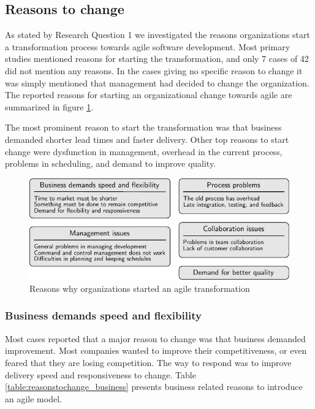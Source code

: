 \documentclass[preprint,authoryear,12pt]{elsarticle}
\begin{document}
\clearpage

\subsection{Reasons to change}

As stated by Research Question 1 we investigated the reasons organizations start
a transformation process towards agile software development. Most primary
studies mentioned reasons for starting the transformation, and only 7 cases of
42 did not mention any reasons. In the cases giving no specific reason to change
it was simply mentioned that management had decided to change the organization.
The reported reasons for starting an organizational change towards agile are
summarized in figure \ref{fig:reasonstochange_summary}.



The most prominent reason to start the transformation was that business demanded
shorter lead times and faster delivery. Other top reasons to start change were
dysfunction in management, overhead in the current process, problems in
scheduling, and demand to improve quality.


\begin{figure}[h]
  \begin{center}
    \includegraphics{graphics/reasonstochange_summary.pdf}
    \caption{Reasons why organizations started an agile transformation}
    \label{fig:reasonstochange_summary}
  \end{center}
\end{figure}

\subsubsection{Business demands speed and flexibility}

Most cases reported that a major reason to change was that business demanded
improvement. Most companies wanted to improve their competitiveness, or even
feared that they are losing competition. The way to respond was to improve
delivery speed and responsiveness to change. Table
\ref{table:reasonstochange_business} presents business related reasons to
introduce an agile model.
\end{document}
